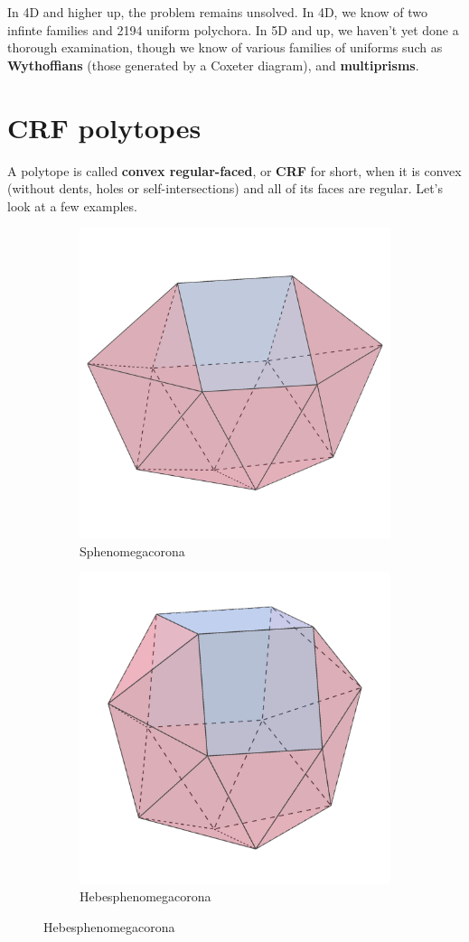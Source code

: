\documentclass{article}
\begin{document}
In 4D and higher up, the problem remains unsolved. In 4D, we know of two infinte families and 2194 uniform polychora. In 5D and up, we haven't yet done a thorough examination, though we know of various families of uniforms such as \textbf{Wythoffians} (those generated by a Coxeter diagram), and \textbf{multiprisms}.

\section{CRF polytopes}
A polytope is called \textbf{convex regular-faced}, or \textbf{CRF} for short, when it is convex (without dents, holes or self-intersections) and all of its faces are regular. Let's look at a few examples.

\begin{figure}[h]
  \centering
  \begin{subfigure}{.33333\textwidth}
    \centering
    \includegraphics[width=.5\linewidth]{Sphenomegacorona}
    \caption{Sphenomegacorona}
    \label{fig:polyhedra_1}
  \end{subfigure}%
  \begin{subfigure}{.33333\textwidth}
    \centering
    \includegraphics[width=.5\linewidth]{Hebesphenomegacorona}
    \caption{Hebesphenomegacorona}

\end{subfigure}
\end{figure}
\end{document}
